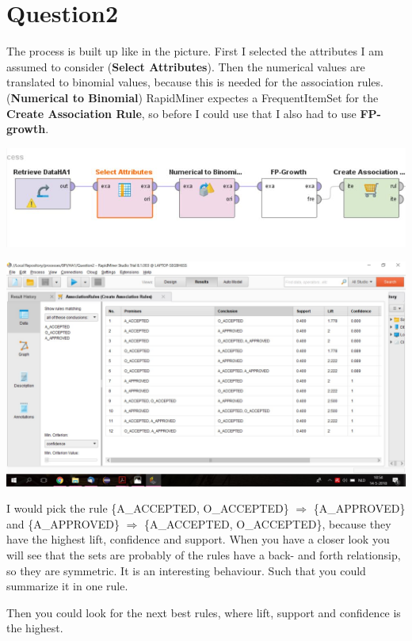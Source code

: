 \section*{Question2}
The process is built up like in the picture. First I selected the attributes I
am assumed to consider (\textbf{Select Attributes}). Then the numerical values
are translated to binomial values, because this is needed for the association
rules. (\textbf{Numerical to Binomial}) RapidMiner expectes a FrequentItemSet
for the \textbf{Create Association Rule}, so before I could use that I also had
to use \textbf{FP-growth}.

\includegraphics[width=\textwidth]{Question2Process.jpg}

\includegraphics[width=\textwidth]{Question2Rapid.jpg}

I would pick the rule \{A\_ACCEPTED, O\_ACCEPTED\} $\Rightarrow$	\{A\_APPROVED\}
and \{A\_APPROVED\} $\Rightarrow$	\{A\_ACCEPTED, O\_ACCEPTED\}, because they
have the highest lift, confidence and support. When you have a closer look you
will see that the sets are probably of the rules have a back- and forth
relationsip, so they are symmetric. It is an interesting behaviour. Such that
you could summarize it in one rule. 

Then you could look for the next best rules, where lift, support and confidence is the highest.
